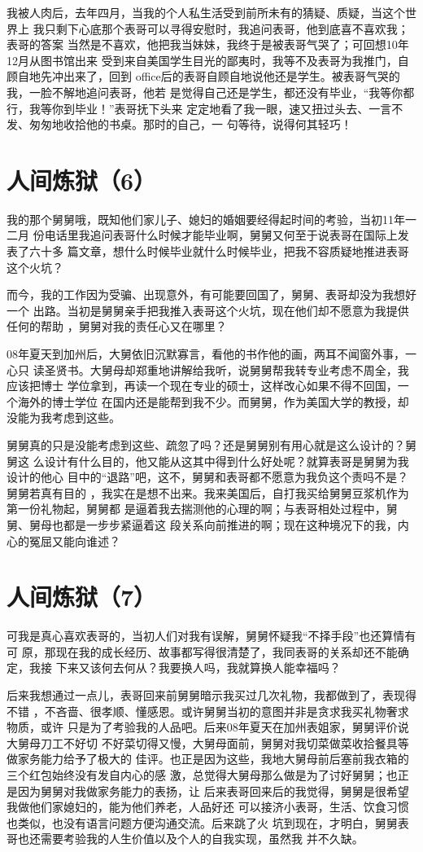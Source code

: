 \documentclass[12pt]{book}
\begin{document}
我被人肉后，去年四月，当我的个人私生活受到前所未有的猜疑、质疑，当这个世界上
我只剩下心底那个表哥可以寻得安慰时，我追问表哥，他到底喜不喜欢我；表哥的答案
当然是不喜欢，他把我当妹妹，我终于是被表哥气哭了；可回想10年12月从图书馆出来
受到来自美国学生目光的鄙夷时，我等不及表哥为我推门，自顾自地先冲出来了，回到
office后的表哥自顾自地说他还是学生。被表哥气哭的我，一脸不解地追问表哥，他若
是觉得自己还是学生，都还没有毕业，“我等你都行，我等你到毕业！”表哥抚下头来
定定地看了我一眼，速又扭过头去、一言不发、匆匆地收拾他的书桌。那时的自己，一
句等待，说得何其轻巧！
\section{人间炼狱（6）}
\label{sec-10-6}

我的那个舅舅哦，既知他们家儿子、媳妇的婚姻要经得起时间的考验，当初11年一二月
份电话里我追问表哥什么时候才能毕业啊，舅舅又何至于说表哥在国际上发表了六十多
篇文章，想什么时候毕业就什么时候毕业，把我不容质疑地推进表哥这个火坑？

而今，我的工作因为受骗、出现意外，有可能要回国了，舅舅、表哥却没为我想好一个
出路。当初是舅舅亲手把我推入表哥这个火坑，现在他们却不愿意为我提供任何的帮助
，舅舅对我的责任心又在哪里？

08年夏天到加州后，大舅依旧沉默寡言，看他的书作他的画，两耳不闻窗外事，一心只
读圣贤书。大舅母却郑重地讲解给我听，说舅舅帮我转专业考虑不周全，我应该把博士
学位拿到，再读一个现在专业的硕士，这样改心如果不得不回国，一个海外的博士学位
在国内还是能帮到我不少。而舅舅，作为美国大学的教授，却没能为我考虑到这些。

舅舅真的只是没能考虑到这些、疏忽了吗？还是舅舅别有用心就是这么设计的？舅舅这
么设计有什么目的，他又能从这其中得到什么好处呢？就算表哥是舅舅为我设计的他心
目中的“退路”吧，这不，舅舅和表哥都不愿意为我负这个责吗不是？舅舅若真有目的
，我实在是想不出来。我来美国后，自打我买给舅舅豆浆机作为第一份礼物起，舅舅都
是逼着我去揣测他的心理的啊；与表哥相处过程中，舅舅、舅母也都是一步步紧逼着这
段关系向前推进的啊；现在这种境况下的我，内心的冤屈又能向谁述？
\section{人间炼狱（7）}
\label{sec-10-7}

可我是真心喜欢表哥的，当初人们对我有误解，舅舅怀疑我“不择手段”也还算情有可
原，那现在我的成长经历、故事都写得很清楚了，我同表哥的关系却还不能确定，我接
下来又该何去何从？我要换人吗，我就算换人能幸福吗？

后来我想通过一点儿，表哥回来前舅舅暗示我买过几次礼物，我都做到了，表现得不错
，不吝啬、很孝顺、懂感恩。或许舅舅当初的意图并非是贪求我买礼物奢求物质，或许
只是为了考验我的人品吧。后来08年夏天在加州表姐家，舅舅评价说大舅母刀工不好切
不好菜切得又慢，大舅母面前，舅舅对我切菜做菜收拾餐具等做家务能力给予了极大的
佳评。也正是因为这些，我地大舅母前后塞前我衣箱的三个红包始终没有发自内心的感
激，总觉得大舅母那么做是为了讨好舅舅；也正是因为舅舅对我做家务能力的表扬，让
后来表哥回来后的我觉得，舅舅是很希望我做他们家媳妇的，能为他们养老，人品好还
可以接济小表哥，生活、饮食习惯也类似，也没有语言问题方便沟通交流。后来跳了火
坑到现在，才明白，舅舅表哥也还需要考验我的人生价值以及个人的自我实现，虽然我
并不久缺。
\end{document}
